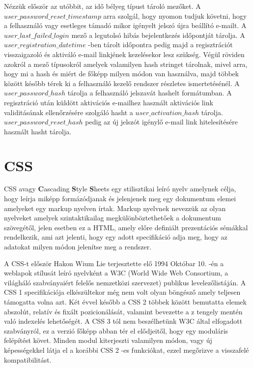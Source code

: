 \documentclass[12pt]{report}
\theoremstyle{definition}
\begin{document}
	Nézzük először az utóbbit, az idő bélyeg típust tároló mezőket. A \linebreak $user\_password\_reset\_timestamp$ arra szolgál, hogy nyomon tudjuk követni, hogy a felhasználó vagy esetleges támadó mikor igényelt jelszó újra beállító e-mailt. A \linebreak$user\_last\_failed\_login$ mező a legutolsó hibás bejelentkezés időpontját tárolja. A \linebreak$user\_registration\_datetime$ -ben tárolt időpontra pedig majd a regisztrációt visszaigazoló és aktiváló e-mail linkjének kezelésekor lesz szükség. Végül röviden azokról a mező típusokról amelyek valamilyen hash stringet tárolnak, mivel arra, hogy mi a hash és miért de főképp milyen módon van használva, majd többek között később térek ki a felhasználó kezelő rendszer részletes ismertetésénél. A $user\_password\_hash$ tárolja a felhasználó jelszavát hashelt formátumban. A regisztráció után küldött aktivációs e-mailhez használt aktivációs link validitásának ellenőrzésére szolgáló hasht a  $user\_activation\_hash$ tárolja. $user\_password\_reset\_hash$ pedig az új jelszót igénylő e-mail link hitelesítésére használt hasht tárolja.
	
	\section{CSS}
	CSS avagy \textbf{C}ascading \textbf{S}tyle \textbf{S}heets egy stilisztikai leíró nyelv amelynek célja, hogy leírja miképp formázódjanak és jelenjenek meg egy dokumentum elemei amelyeket egy markup nyelven írtak. Markup nyelvnek nevezzük az olyan nyelveket amelyek szintaktikailag megkülönböztethetőek a dokumentum szövegétől, jelen esetben ez a HTML, amely előre definiált prezentációs sémákkal rendelkezik, ami azt jelenti, hogy egy adott specifikáció adja meg, hogy az adatokat milyen módon jelenítse meg a rendszer. 
	
	A CSS-t először Hakon Wium Lie terjesztette elő 1994 Októbar 10. -én \cite{CSS-origin} a weblapok stílusát leíró nyelvként a W3C (World Wide Web Consortium, a világháló szabványaiért felelős nemzetközi szervezet) publikus levelezőlistáján. A CSS 1 specifikációja elkészültekor még nem volt olyan böngésző amely teljesen támogatta volna azt. Két évvel később a CSS 2 többek között bemutatta elemek abszolút, relatív és fixált pozicionálását, valamint bevezette a z tengely mentén való indexelés lehetőségét. A CSS 3 tól nem beszélhetünk W3C által elfogadott szabványról, ez a verzió főképp abban tér el elődjeitől, hogy egy moduláris felépítést követ. Minden modul kiterjeszti valamilyen módon, vagy új képességekkel látja el a korábbi CSS 2 -es funkciókat, ezzel megőrizve a visszafelé kompatibilitást. 
	
\end{document}
